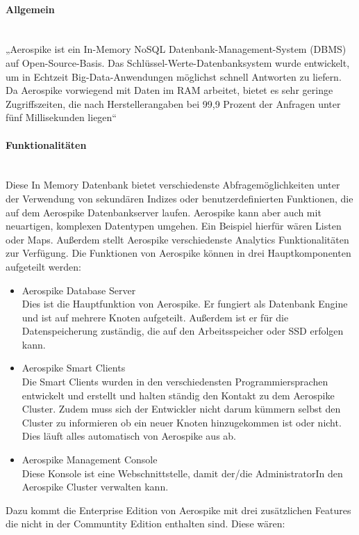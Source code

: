 \paragraph{Allgemein}\mbox{} \\
„Aerospike ist ein In-Memory NoSQL Datenbank-Management-System (DBMS) auf Open-Source-Basis. Das Schlüssel-Werte-Datenbanksystem wurde entwickelt, um in Echtzeit Big-Data-Anwendungen möglichst schnell Antworten zu liefern. Da Aerospike vorwiegend mit Daten im RAM arbeitet, bietet es sehr geringe Zugriffszeiten, die nach Herstellerangaben bei 99,9 Prozent der Anfragen unter fünf Millisekunden liegen“~\cite{computer_funktionen_2020}
\paragraph{Funktionalitäten}\mbox{} \\
Diese In Memory Datenbank bietet verschiedenste Abfragemöglichkeiten unter der Verwendung von sekundären Indizes oder benutzerdefinierten Funktionen, die auf dem Aerospike Datenbankserver laufen. Aerospike kann aber auch mit neuartigen, komplexen Datentypen umgehen. Ein Beispiel hierfür wären Listen oder Maps. Außerdem stellt Aerospike verschiedenste Analytics Funktionalitäten zur Verfügung. Die Funktionen von Aerospike können in drei Hauptkomponenten aufgeteilt werden:
\begin{itemize}
\item{Aerospike Database Server} \mbox{} \\
Dies ist die Hauptfunktion von Aerospike. Er fungiert als Datenbank Engine und ist auf mehrere Knoten aufgeteilt. Außerdem ist er für die Datenspeicherung zuständig, die auf den Arbeitsspeicher oder SSD erfolgen kann.
\item{Aerospike Smart Clients} \mbox{} \\
Die Smart Clients wurden in den verschiedensten Programmiersprachen entwickelt und erstellt und halten ständig den Kontakt zu dem Aerospike Cluster. Zudem muss sich der Entwickler nicht darum kümmern selbst den Cluster zu informieren ob ein neuer Knoten hinzugekommen ist oder nicht. Dies läuft alles automatisch von Aerospike aus ab.
\item{Aerospike Management Console} \mbox{} \\
Diese Konsole ist eine Webschnittstelle, damit der/die AdministratorIn den Aerospike Cluster verwalten kann.
\end{itemize}
Dazu kommt die Enterprise Edition von Aerospike mit drei zusätzlichen Features die nicht in der Communtity Edition enthalten sind. Diese wären:
